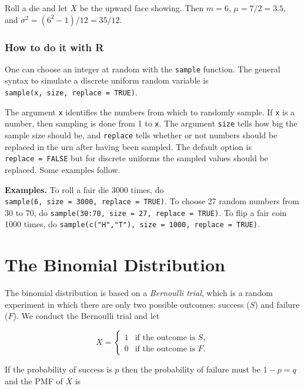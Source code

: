 \documentclass[]{book}
\numberwithin{equation}{chapter}
\numberwithin{figure}{chapter}
\theoremstyle{plain}
\theoremstyle{definition}
\theoremstyle{remark}
\theoremstyle{definition}
\theoremstyle{definition}
\theoremstyle{remark}
\let\BeginKnitrBlock\begin \let\EndKnitrBlock\end
\begin{document}
\bigskip

\BeginKnitrBlock{example}
\protect\hypertarget{ex:unnamed-chunk-204}{}{\label{ex:unnamed-chunk-204}}Roll
a die and let \(X\) be the upward face showing. Then \(m = 6\),
\(\mu = 7/2 = 3.5\), and \(\sigma^{2} = (6^{2} - 1)/12 = 35/12\).
\EndKnitrBlock{example}

\subsubsection{How to do it with R}\label{how-to-do-it-with-r-20}

One can choose an integer at random with the \texttt{sample} function.
The general syntax to simulate a discrete uniform random variable is
\texttt{sample(x,\ size,\ replace\ =\ TRUE)}.

The argument \texttt{x} identifies the numbers from which to randomly
sample. If \texttt{x} is a number, then sampling is done from 1 to
\texttt{x}. The argument \texttt{size} tells how big the sample size
should be, and \texttt{replace} tells whether or not numbers should be
replaced in the urn after having been sampled. The default option is
\texttt{replace\ =\ FALSE} but for discrete uniforms the sampled values
should be replaced. Some examples follow.

\textbf{Examples.} To roll a fair die 3000 times, do
\texttt{sample(6,\ size\ =\ 3000,\ replace\ =\ TRUE)}. To choose 27
random numbers from 30 to 70, do
\texttt{sample(30:70,\ size\ =\ 27,\ replace\ =\ TRUE)}. To flip a fair
coin 1000 times, do
\texttt{sample(c("H","T"),\ size\ =\ 1000,\ replace\ =\ TRUE)}.

\section{The Binomial Distribution}\label{sec-binom-dist}

The binomial distribution is based on a \emph{Bernoulli trial}, which is
a random experiment in which there are only two possible outcomes:
success (\(S\)) and failure (\(F\)). We conduct the Bernoulli trial and
let

\begin{equation} X = \begin{cases} 1 & \mbox{if the outcome is $S$},\\ 0 & \mbox{if the outcome is $F$}. \end{cases} \end{equation}

If the probability of success is \(p\) then the probability of failure
must be \(1-p=q\) and the PMF of \(X\) is
\end{document}
